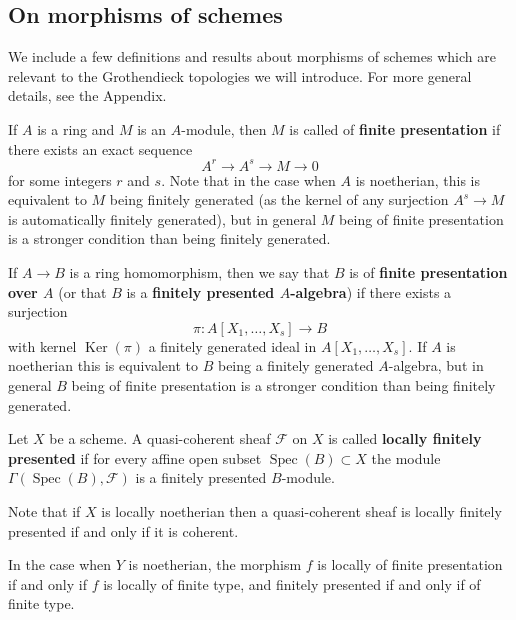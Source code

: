 \documentclass[12pt]{article}
\begin{document}
\subsection{On morphisms of schemes}
We include a few definitions and results about morphisms of schemes which are relevant to the Grothendieck topologies we will introduce. For more general details, see the Appendix.
\begin{definition}
    If $A$ is a ring and $M$ is an $A$-module, then $M$ is called of \textbf{finite presentation} if there exists an exact sequence
    \[
        A^r \to A^s \to M \to 0
    \]
    for some integers $r$ and $s$. Note that in the case when $A$ is noetherian, this is equivalent to $M$ being finitely generated (as the kernel of any surjection $A^s \to M$ is automatically finitely generated), but in general $M$ being of finite presentation is a stronger condition than being finitely generated.

    If $A \to B$ is a ring homomorphism, then we say that $B$ is of \textbf{finite presentation over $A$} (or that $B$ is a \textbf{finitely presented $A$-algebra}) if there exists a surjection
    \[
        \pi : A[X_1,\ldots,X_s] \to B
    \]
    with kernel $\operatorname{Ker}(\pi)$ a finitely generated ideal in $A[X_1,\ldots,X_s]$. If $A$ is noetherian this is equivalent to $B$ being a finitely generated $A$-algebra, but in general $B$ being of finite presentation is a stronger condition than being finitely generated.

    Let $X$ be a scheme. A quasi-coherent sheaf $\mathcal{F}$ on $X$ is called \textbf{locally finitely presented} if for every affine open subset $\operatorname{Spec}(B) \subset X$ the module $\Gamma(\operatorname{Spec}(B), \mathcal{F})$ is a finitely presented $B$-module.
\end{definition}

Note that if $X$ is locally noetherian then a quasi-coherent sheaf is locally finitely presented if and only if it is coherent.

In the case when $Y$ is noetherian, the morphism $f$ is locally of finite presentation if and only if $f$ is locally of finite type, and finitely presented if and only if of finite type.
\end{document}
